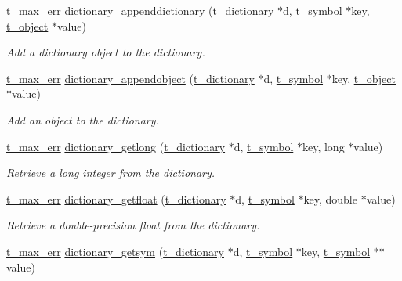 \begin{DoxyCompactItemize}
\hyperlink{group__datatypes_ga73edaae82b318855cc09fac994918165}{t\_\-max\_\-err} \hyperlink{group__dictionary_ga1bd7575368917037f46b5b9076e167c7}{dictionary\_\-appenddictionary} (\hyperlink{structt__dictionary}{t\_\-dictionary} $\ast$d, \hyperlink{structt__symbol}{t\_\-symbol} $\ast$key, \hyperlink{structt__object}{t\_\-object} $\ast$value)
\begin{DoxyCompactList}\small\item\em Add a dictionary object to the dictionary. \item\end{DoxyCompactList}\item 
\hyperlink{group__datatypes_ga73edaae82b318855cc09fac994918165}{t\_\-max\_\-err} \hyperlink{group__dictionary_ga64e86e71b47a2d9719a43ec8bd376591}{dictionary\_\-appendobject} (\hyperlink{structt__dictionary}{t\_\-dictionary} $\ast$d, \hyperlink{structt__symbol}{t\_\-symbol} $\ast$key, \hyperlink{structt__object}{t\_\-object} $\ast$value)
\begin{DoxyCompactList}\small\item\em Add an object to the dictionary. \item\end{DoxyCompactList}\item 
\hyperlink{group__datatypes_ga73edaae82b318855cc09fac994918165}{t\_\-max\_\-err} \hyperlink{group__dictionary_gafd215503871278e2ae02c1c747f39e46}{dictionary\_\-getlong} (\hyperlink{structt__dictionary}{t\_\-dictionary} $\ast$d, \hyperlink{structt__symbol}{t\_\-symbol} $\ast$key, long $\ast$value)
\begin{DoxyCompactList}\small\item\em Retrieve a long integer from the dictionary. \item\end{DoxyCompactList}\item 
\hyperlink{group__datatypes_ga73edaae82b318855cc09fac994918165}{t\_\-max\_\-err} \hyperlink{group__dictionary_ga4e166c9edc4575ec89f176455a134cda}{dictionary\_\-getfloat} (\hyperlink{structt__dictionary}{t\_\-dictionary} $\ast$d, \hyperlink{structt__symbol}{t\_\-symbol} $\ast$key, double $\ast$value)
\begin{DoxyCompactList}\small\item\em Retrieve a double-\/precision float from the dictionary. \item\end{DoxyCompactList}\item 
\hyperlink{group__datatypes_ga73edaae82b318855cc09fac994918165}{t\_\-max\_\-err} \hyperlink{group__dictionary_ga0e5747682765d9a320bb9ccf37d9215d}{dictionary\_\-getsym} (\hyperlink{structt__dictionary}{t\_\-dictionary} $\ast$d, \hyperlink{structt__symbol}{t\_\-symbol} $\ast$key, \hyperlink{structt__symbol}{t\_\-symbol} $\ast$$\ast$value)
$$
\end{DoxyCompactItemize}
